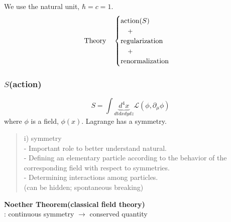 \documentclass[11pt,letterpaper]{article}
\begin{document}
We use the natural unit, $\hbar = c = 1$.
%
\begin{align*}
 \textnormal{Theory} \quad
 \begin{cases}
  \textnormal{action}(S) \\
  \quad \small{\mbox{+}} \\
  \textnormal{regularization} \\
  \quad \small{\mbox{+}} \\
  \textnormal{renormalization}
 \end{cases}
\end{align*}


\subsubsection{$S$(action)}
%
\begin{equation*}
 S = \int \underbrace{d^{4}x}_{dtdxdydz} \mathcal{L}(\phi, \partial_{\mu}\phi)
\end{equation*}
%
where $\phi$ is a field, $\phi(x)$. Lagrange has a symmetry. \\

%

\begin{quote}
i) symmetry \\
- Important role to better understand natural. \\
- Defining an elementary particle according to the behavior of the corresponding field with respect to symmetries. \\
- Determining interactions among particles. \\
(can be hidden; spontaneous breaking) \\
%
\end{quote}

%

{\bf Noether Theorem(classical field theory)} \\
%
: continuous symmetry $\rightarrow$ conserved quantity

\VS
\end{document}
